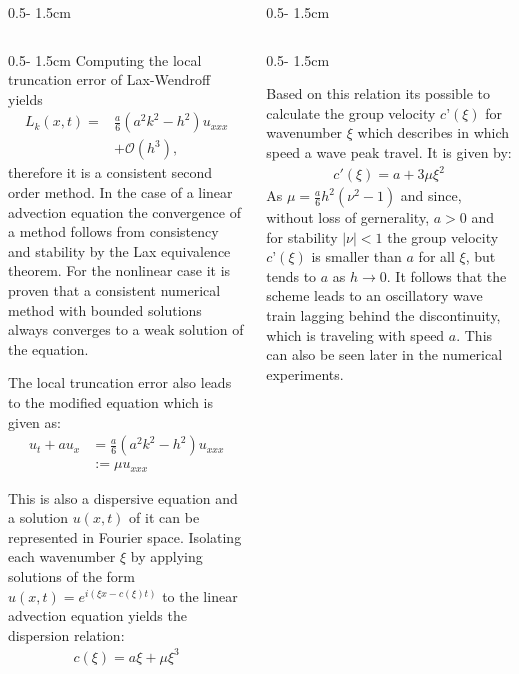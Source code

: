 \documentclass{uibposter}
\begin{document}
\begin{frame}[fragile]
\begin{columns}
\begin{column}{0.5\textwidth - 1.5cm}
\begin{column}{0.5\textwidth - 1.5cm}
\vspace{0.5cm}
Computing the local truncation error of Lax-Wendroff yields
\begin{align*}
L_k(x, t) = &\frac{a}{6}(a^2 k^2 - h^2)u_{xxx} \\
&+ \mathcal{O}(h^3) \text{,}
\end{align*}
therefore it is a consistent second order method. 
In the case of a linear advection equation the convergence of a method follows from consistency and stability by the Lax equivalence theorem. For the nonlinear case it is proven that a consistent numerical method with bounded solutions always converges to a weak solution of the equation.

\vspace{0.5cm}
The local truncation error also leads to the modified equation which is given as:
\begin{align*}
u_t + a u_x &= \frac{a}{6} (a^2 k^2 - h^2) u_{xxx}\\
&:= \mu u_{xxx}
\end{align*}

This is also a dispersive equation and a solution $u(x, t)$ of it can be represented in Fourier space. Isolating each wavenumber $\xi$ by applying solutions of the form $u(x,t) = e^{i(\xi x - c(\xi)t)}$ to the linear advection equation yields the dispersion relation:
\begin{align*}
c(\xi) = a\xi + \mu \xi^3
\end{align*}

    \end{column}
\end{column}
\begin{column}{0.5\textwidth - 1.5cm}
\begin{column}{0.5\textwidth - 1.5cm}
\vspace*{-1.7cm}

Based on this relation its possible to calculate the group velocity $c’(\xi)$ for wavenumber $\xi$ which describes in which speed a wave peak travel. It is given by:
\begin{align*}
c'(\xi) = a + 3\mu \xi^2
\end{align*}
As $\mu = \frac{a}{6}h^2(\nu^2 - 1)$ and since, without loss of gernerality, $a > 0$ and for stability $|\nu| < 1$ the group velocity $c’(\xi)$ is smaller than $a$ for all $\xi$, but tends to $a$ as $h\rightarrow0$. It follows that the scheme leads to an oscillatory wave train lagging behind the discontinuity, which is traveling with speed $a$. This can also be seen later in the numerical experiments.
    

\end{column}
\end{column}
\end{columns}
\end{frame}
\end{document}
